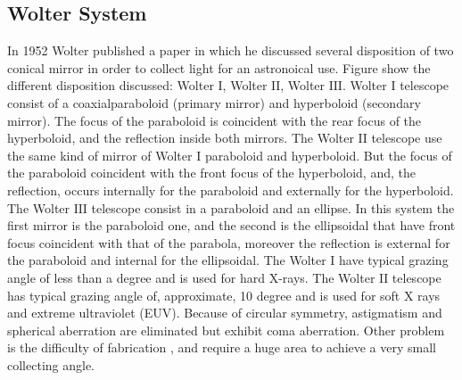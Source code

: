 \subsection{Wolter System}
\hspace{10mm} In 1952 Wolter published a paper in which he discussed several disposition of two conical mirror in order to collect light for an astronoical use. Figure show the different disposition discussed: Wolter $\mathrm{I} $, Wolter $\mathrm{II} $, Wolter $\mathrm{III} $.
\noindent Wolter $\mathrm{I} $ telescope consist of a coaxialparaboloid (primary mirror) and hyperboloid (secondary mirror). The focus of the paraboloid is coincident with the rear focus of the hyperboloid, and the reflection inside both mirrors. The Wolter $\mathrm{II} $ telescope use the same kind of mirror of Wolter $\mathrm{I} $ paraboloid and hyperboloid. But the focus of the paraboloid coincident with the front focus of the hyperboloid, and, the reflection, occurs internally for the paraboloid and externally for the hyperboloid. The Wolter $\mathrm{III} $ telescope consist in a paraboloid and an ellipse. In this system the first mirror is the paraboloid one, and the second is the ellipsoidal that have front focus coincident with that of the parabola, moreover the reflection is external for the paraboloid and internal for the ellipsoidal.
\noindent The Wolter $\mathrm{I} $ have typical grazing angle of less than a degree and is used for hard X-rays. The Wolter $\mathrm{II} $ telescope has typical grazing angle of, approximate, 10 degree and is used for soft X rays and extreme ultraviolet (EUV).
\noindent Because of circular symmetry, astigmatism and spherical aberration are eliminated but  exhibit coma aberration. Other problem is the difficulty of fabrication , and require a huge area to achieve a very small collecting angle.

